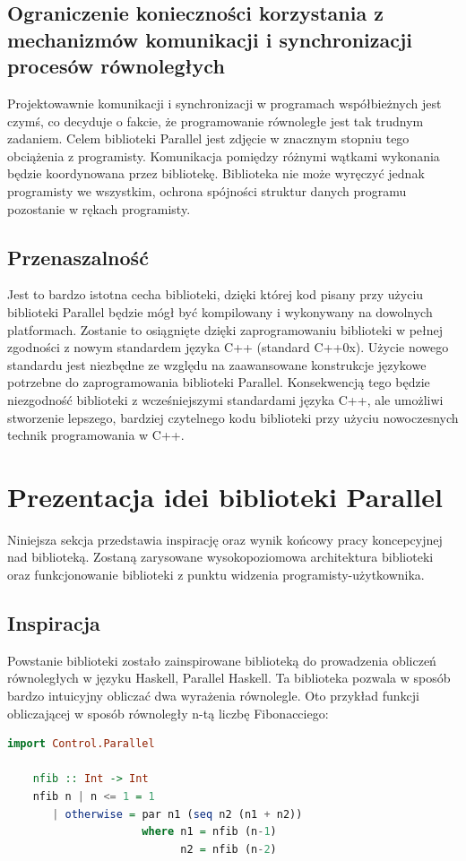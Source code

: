 \subsection{Ograniczenie konieczności korzystania z mechanizmów komunikacji i synchronizacji procesów równoległych}

  Projektowawnie komunikacji i synchronizacji w programach współbieżnych jest czymś, co decyduje o fakcie, że programowanie równoległe jest tak trudnym zadaniem.
  Celem biblioteki Parallel jest zdjęcie w znacznym stopniu tego obciążenia z programisty.
  Komunikacja pomiędzy różnymi wątkami wykonania będzie koordynowana przez bibliotekę.
  Biblioteka nie może wyręczyć jednak programisty we wszystkim, ochrona spójności struktur danych programu pozostanie w rękach programisty.
  
\subsection{Przenaszalność}
  
  Jest to bardzo istotna cecha biblioteki, dzięki której kod pisany przy użyciu biblioteki Parallel będzie mógł być kompilowany i wykonywany na dowolnych platformach.
  Zostanie to osiągnięte dzięki zaprogramowaniu biblioteki w pełnej zgodności z nowym standardem języka C++ (standard C++0x).
  Użycie nowego standardu jest niezbędne ze względu na zaawansowane konstrukcje językowe potrzebne do zaprogramowania biblioteki Parallel.
  Konsekwencją tego będzie niezgodność biblioteki z wcześniejszymi standardami języka C++, ale umożliwi stworzenie lepszego, bardziej czytelnego kodu biblioteki przy użyciu nowoczesnych technik programowania w C++.


\section{Prezentacja idei biblioteki Parallel}

  Niniejsza sekcja przedstawia inspirację oraz wynik końcowy pracy koncepcyjnej nad biblioteką.
  Zostaną zarysowane wysokopoziomowa architektura biblioteki oraz funkcjonowanie biblioteki z punktu widzenia programisty-użytkownika.

\subsection{Inspiracja}

  Powstanie biblioteki zostało zainspirowane biblioteką do prowadzenia obliczeń równoległych w języku Haskell, Parallel Haskell\cite{parhas}.
  Ta biblioteka pozwala w sposób bardzo intuicyjny obliczać dwa wyrażenia równolegle.
  Oto przykład funkcji obliczającej w sposób równoległy n-tą liczbę Fibonacciego:
  \begin{lstlisting}[language=Haskell]
    import Control.Parallel

    nfib :: Int -> Int
    nfib n | n <= 1 = 1
       | otherwise = par n1 (seq n2 (n1 + n2))
                     where n1 = nfib (n-1)
                           n2 = nfib (n-2)
  \end{lstlisting}
  
